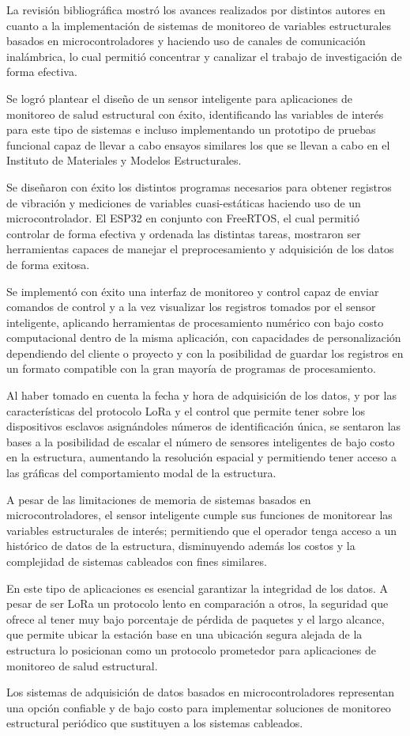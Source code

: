 	
	La revisión bibliográfica mostró los avances realizados por distintos autores en cuanto a la implementación de sistemas de monitoreo de variables estructurales basados en microcontroladores y haciendo uso de canales de comunicación inalámbrica, lo cual permitió concentrar y canalizar el trabajo de investigación de forma efectiva.
	
	Se logró plantear el diseño de un sensor inteligente para aplicaciones de monitoreo de salud estructural con éxito, identificando las variables de interés para este tipo de sistemas e incluso implementando un prototipo de pruebas funcional capaz de llevar a cabo ensayos similares los que se llevan a cabo en el Instituto de Materiales y Modelos Estructurales.
	
	Se diseñaron con éxito los distintos programas necesarios para obtener registros de vibración y mediciones de variables cuasi-estáticas haciendo uso de un microcontrolador. El ESP32 en conjunto con FreeRTOS, el cual permitió controlar de forma efectiva y ordenada las distintas tareas, mostraron ser herramientas capaces de manejar el preprocesamiento y adquisición de los datos de forma exitosa.
	
	Se implementó con éxito una interfaz de monitoreo y control capaz de enviar comandos de control y a la vez visualizar los registros tomados por el sensor inteligente, aplicando herramientas de procesamiento numérico con bajo costo computacional dentro de la misma aplicación, con capacidades de personalización dependiendo del cliente o proyecto y con la posibilidad de  guardar los registros en un formato compatible con la gran mayoría de programas de procesamiento.
	
	Al haber tomado en cuenta la fecha y hora de adquisición de los datos, y por las características del protocolo LoRa y el control que permite tener sobre los dispositivos esclavos asignándoles números de identificación única, se sentaron las bases a la posibilidad de escalar el número de sensores inteligentes de bajo costo en la estructura, aumentando la resolución espacial y permitiendo tener acceso a las gráficas del comportamiento modal de la estructura.
	
	A pesar de las limitaciones de memoria de sistemas basados en microcontroladores, el sensor inteligente cumple sus funciones de monitorear las variables estructurales de interés; permitiendo que el operador tenga acceso a un histórico de datos de la estructura, disminuyendo además los costos y la complejidad de sistemas cableados con fines similares.
	
	En este tipo de aplicaciones es esencial garantizar la integridad de los datos.	A pesar de ser LoRa un protocolo lento en comparación a otros, la seguridad que ofrece al tener muy bajo porcentaje de pérdida de paquetes y el largo alcance, que permite ubicar la estación base en una ubicación segura alejada de la estructura lo posicionan como un protocolo prometedor para aplicaciones de monitoreo de salud estructural. 
	
    Los sistemas de adquisición de datos basados en microcontroladores representan una opción confiable y de bajo costo para implementar soluciones de monitoreo estructural periódico que sustituyen a los sistemas cableados.